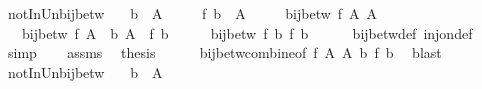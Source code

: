 \begin{isabellebody}
\ notIn{\isacharunderscore}{\kern0pt}Un{\isacharunderscore}{\kern0pt}bij{\isacharunderscore}{\kern0pt}betw{\isacharcolon}{\kern0pt}\isanewline
\ \ \ {\isachardoublequoteopen}b\ {\isasymnotin}\ A{\isachardoublequoteclose}\isanewline
\ \ \ \ \ {\isachardoublequoteopen}f\ b\ {\isasymnotin}\ A{\isacharprime}{\kern0pt}{\isachardoublequoteclose}\isanewline
\ \ \ \ \ {\isachardoublequoteopen}bij{\isacharunderscore}{\kern0pt}betw\ f\ A\ A{\isacharprime}{\kern0pt}{\isachardoublequoteclose}\isanewline
\ \ \ {\isachardoublequoteopen}bij{\isacharunderscore}{\kern0pt}betw\ f\ {\isacharparenleft}{\kern0pt}A\ {\isasymunion}\ {\isacharbraceleft}{\kern0pt}b{\isacharbraceright}{\kern0pt}{\isacharparenright}{\kern0pt}\ {\isacharparenleft}{\kern0pt}A{\isacharprime}{\kern0pt}\ {\isasymunion}\ {\isacharbraceleft}{\kern0pt}f\ b{\isacharbraceright}{\kern0pt}{\isacharparenright}{\kern0pt}{\isachardoublequoteclose}\isanewline
%
\isadelimproof
%
\endisadelimproof
%
\isatagproof
{}\isamarkupfalse%
\ {\isacharminus}{\kern0pt}\isanewline
\ \ \isamarkupfalse%
\ {\isachardoublequoteopen}bij{\isacharunderscore}{\kern0pt}betw\ f\ {\isacharbraceleft}{\kern0pt}b{\isacharbraceright}{\kern0pt}\ {\isacharbraceleft}{\kern0pt}f\ b{\isacharbraceright}{\kern0pt}{\isachardoublequoteclose}\isanewline
\ \ \ \ \isamarkupfalse%
\ bij{\isacharunderscore}{\kern0pt}betw{\isacharunderscore}{\kern0pt}def\ inj{\isacharunderscore}{\kern0pt}on{\isacharunderscore}{\kern0pt}def\ \isamarkupfalse%
\ simp\isanewline
\ \ \isamarkupfalse%
\ assms\ \isamarkupfalse%
\ {\isacharquery}{\kern0pt}thesis\isanewline
\ \ \ \ \isamarkupfalse%
\ bij{\isacharunderscore}{\kern0pt}betw{\isacharunderscore}{\kern0pt}combine{\isacharbrackleft}{\kern0pt}of\ f\ A\ A{\isacharprime}{\kern0pt}\ {\isachardoublequoteopen}{\isacharbraceleft}{\kern0pt}b{\isacharbraceright}{\kern0pt}{\isachardoublequoteclose}\ {\isachardoublequoteopen}{\isacharbraceleft}{\kern0pt}f\ b{\isacharbraceright}{\kern0pt}{\isachardoublequoteclose}{\isacharbrackright}{\kern0pt}\ \isamarkupfalse%
\ blast\isanewline
{}\isamarkupfalse%
%
\endisatagproof
{\isafoldproof}%
%
\isadelimproof
\isanewline
%
\endisadelimproof
\isanewline
{}\isamarkupfalse%
\ notIn{\isacharunderscore}{\kern0pt}Un{\isacharunderscore}{\kern0pt}bij{\isacharunderscore}{\kern0pt}betw{}{\isacharcolon}{\kern0pt}\isanewline
\ \ \ {\isachardoublequoteopen}b\ {\isasymnotin}\ A{\isachardoublequoteclose}\isanewline

\end{isabellebody}
